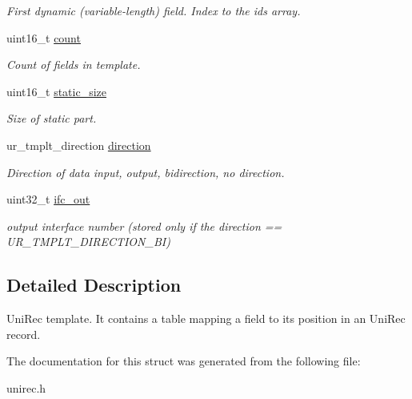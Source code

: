 \begin{DoxyCompactItemize}
\begin{DoxyCompactList}\small\item\em First dynamic (variable-\/length) field. Index to the ids array. \end{DoxyCompactList}\item 
uint16\+\_\+t \hyperlink{structur__template__t_a3331d5fc7eeda55fbbb33543da5db0d9}{count}\hypertarget{structur__template__t_a3331d5fc7eeda55fbbb33543da5db0d9}{}\label{structur__template__t_a3331d5fc7eeda55fbbb33543da5db0d9}

\begin{DoxyCompactList}\small\item\em Count of fields in template. \end{DoxyCompactList}\item 
uint16\+\_\+t \hyperlink{structur__template__t_a5ec4e8fb6f0bacae7cda7af77f8ef1e2}{static\+\_\+size}\hypertarget{structur__template__t_a5ec4e8fb6f0bacae7cda7af77f8ef1e2}{}\label{structur__template__t_a5ec4e8fb6f0bacae7cda7af77f8ef1e2}

\begin{DoxyCompactList}\small\item\em Size of static part. \end{DoxyCompactList}\item 
ur\+\_\+tmplt\+\_\+direction \hyperlink{structur__template__t_a099d176cd55c8e16d01a3e9eb6f8c6d4}{direction}\hypertarget{structur__template__t_a099d176cd55c8e16d01a3e9eb6f8c6d4}{}\label{structur__template__t_a099d176cd55c8e16d01a3e9eb6f8c6d4}

\begin{DoxyCompactList}\small\item\em Direction of data input, output, bidirection, no direction. \end{DoxyCompactList}\item 
uint32\+\_\+t \hyperlink{structur__template__t_a547b0de3d97d62b5415ebcc371e87a19}{ifc\+\_\+out}\hypertarget{structur__template__t_a547b0de3d97d62b5415ebcc371e87a19}{}\label{structur__template__t_a547b0de3d97d62b5415ebcc371e87a19}

\begin{DoxyCompactList}\small\item\em output interface number (stored only if the direction == U\+R\+\_\+\+T\+M\+P\+L\+T\+\_\+\+D\+I\+R\+E\+C\+T\+I\+O\+N\+\_\+\+BI) \end{DoxyCompactList}\end{DoxyCompactItemize}


\subsection{Detailed Description}
Uni\+Rec template. It contains a table mapping a field to its position in an Uni\+Rec record. 

The documentation for this struct was generated from the following file\+:\begin{DoxyCompactItemize}
\item 
unirec.\+h\end{DoxyCompactItemize}
